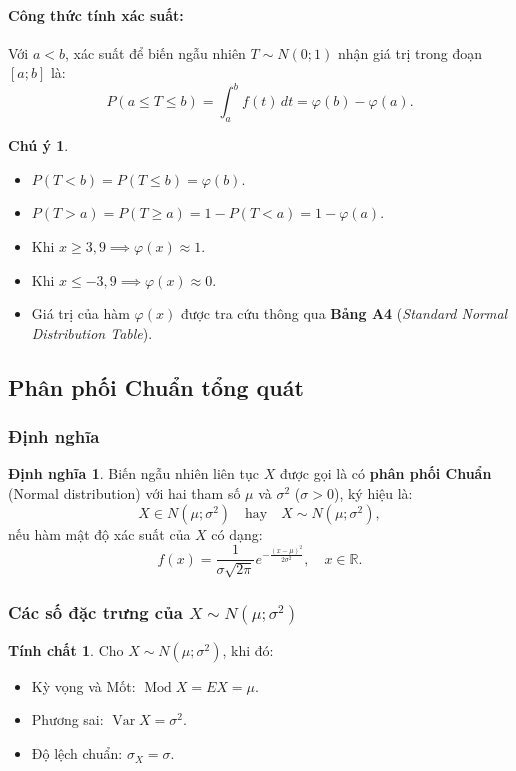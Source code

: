 \documentclass[12pt,a4paper]{article}
\theoremstyle{definition}
\newtheorem{dinhnghia}{Định nghĩa}[section]
\newtheorem{chuy}{Chú ý}[section]
\newtheorem{tinhchat}{Tính chất}[section]
\begin{document}
\paragraph{Công thức tính xác suất:}
Với $a < b$, xác suất để biến ngẫu nhiên $T \sim N(0; 1)$ nhận giá trị trong đoạn $[a; b]$ là:
\[
P(a \le T \le b) = \int_a^b f(t)\,dt = \varphi(b) - \varphi(a).
\]

\begin{chuy}
\begin{itemize}
    \item $P(T < b) = P(T \le b) = \varphi(b)$.
    \item $P(T > a) = P(T \ge a) = 1 - P(T < a) = 1 - \varphi(a)$.
    \item Khi $x \ge 3{,}9 \implies \varphi(x) \approx 1$.
    \item Khi $x \le -3{,}9 \implies \varphi(x) \approx 0$.
    \item Giá trị của hàm $\varphi(x)$ được tra cứu thông qua \textbf{Bảng A4} (\textit{Standard Normal Distribution Table}).
\end{itemize}
\end{chuy}

\subsection{Phân phối Chuẩn tổng quát}

\subsubsection{Định nghĩa}

\begin{dinhnghia}
Biến ngẫu nhiên liên tục $X$ được gọi là có \textbf{phân phối Chuẩn} (Normal distribution) với hai tham số $\mu$ và $\sigma^2$ ($\sigma > 0$), ký hiệu là:
\[
X \in N(\mu; \sigma^2) \quad \text{hay} \quad X \sim N(\mu; \sigma^2),
\]
nếu hàm mật độ xác suất của $X$ có dạng:
\[
f(x) = \frac{1}{\sigma\sqrt{2\pi}} e^{-\frac{(x - \mu)^2}{2\sigma^2}}, \quad x \in \mathbb{R}.
\]
\end{dinhnghia}

\subsubsection{Các số đặc trưng của \texorpdfstring{$X \sim N(\mu; \sigma^2)$}{X ~ N(mu; sigma2)}}

\begin{tinhchat}
Cho $X \sim N(\mu; \sigma^2)$, khi đó:
\begin{itemize}
    \item Kỳ vọng và Mốt: $\operatorname{Mod} X = EX = \mu$.
    \item Phương sai: $\operatorname{Var} X = \sigma^2$.
    \item Độ lệch chuẩn: $\sigma_X = \sigma$.
\end{itemize}
\end{tinhchat}
\end{document}
